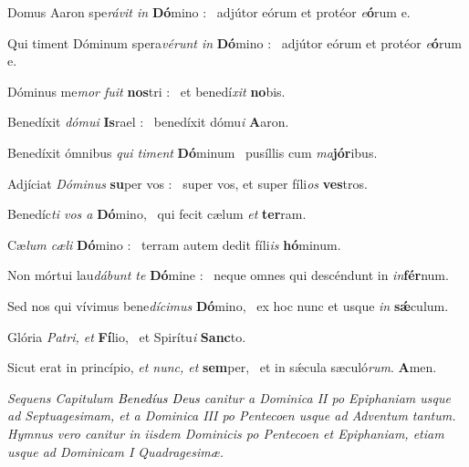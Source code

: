 \documentclass[12pt]{article} %
\def\noinitial{%
\setspaceafterinitial{0pt plus 0em minus 0em}%
\setspacebeforeinitial{0pt plus 0em minus 0em}%
\relax %
}
\newenvironment{psalmtext}{\leftskip 0.25in}{\vspace{2 mm}}
\newenvironment{rubric}{\color{benred8} \itshape \leftskip 0in \setlength{\parindent}{0.25in}}{\vspace{2 mm}}
\let\oldgresixstar\gresixstar
\renewcommand{\gresixstar}{\textcolor{benred8}{\oldgresixstar}}
\begin{document}
\begin{psalmtext}
Domus Aaron spe\emph{rávit in} \textbf{Dó}mino : \gresixstar\ adjútor eórum et protéor \emph{e}\textbf{ó}rum e.

Qui timent Dóminum spera\emph{vérunt in} \textbf{Dó}mino : \gresixstar\ adjútor eórum et protéor \emph{e}\textbf{ó}rum e.

Dóminus me\emph{mor fuit} \textbf{nos}tri : \gresixstar\ et benedí\emph{xit} \textbf{no}bis.

Benedíxit \emph{dómui} \textbf{Is}rael : \gresixstar\ benedíxit dómu\emph{i} \textbf{A}aron.

Benedíxit ómnibus \emph{qui timent} \textbf{Dó}minum \gresixstar\ pusíllis cum \emph{ma}\textbf{jór}ibus.

Adjíciat \emph{Dóminus} \textbf{su}per vos : \gresixstar\ super vos, et super fíli\emph{os} \textbf{ves}tros.

Benedíc\emph{ti vos a} \textbf{Dó}mino, \gresixstar\ qui fecit cælum \emph{et} \textbf{ter}ram.

Cæ\emph{lum cæli} \textbf{Dó}mino : \gresixstar\ terram autem dedit fíli\emph{is} \textbf{hó}minum.

Non mórtui lau\emph{dábunt te} \textbf{Dó}mine : \gresixstar\ neque omnes qui descéndunt in \emph{in}\textbf{fér}num.

Sed nos qui vívimus bene\emph{dícimus} \textbf{Dó}mino, \gresixstar\ ex hoc nunc et usque \emph{in} \textbf{sǽ}culum.

Glória \emph{Patri, et} \textbf{Fí}lio, \gresixstar\ et Spirítu\emph{i} \textbf{Sanc}to.

Sicut erat in princípio, \emph{et nunc, et} \textbf{sem}per, \gresixstar\ et in sǽcula sæculó\emph{rum}. \textbf{A}men.

\end{psalmtext}

{\noinitial
{}
}
\vspace{2 mm}

\begin{rubric}
Sequens Capitulum \emph{\textcolor{black}{Bened\'{i}us Deus}} canitur a Dominica II po  Epiphaniam usque ad Septuagesimam, et a Dominica III po Pentecoen usque ad Adventum tantum. Hymnus vero canitur in iisdem Dominicis po Pentecoen et Epiphaniam, etiam usque ad Dominicam I Quadragesim\ae .

\end{rubric}
\end{document}
